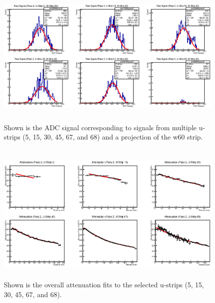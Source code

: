 \begin{figure}[h]
    \centering
    \includegraphics[height= 2.75in, keepaspectratio = true]{pass2}
    \caption{Shown is the ADC signal corresponding to signals from multiple u-strips 
    (5, 15, 30, 45, 67, and 68) and a projection of the w60 strip.}
    \label{fig:pass2}
\end{figure}

\begin{figure}[h]
    \centering
    \includegraphics[height= 2.75in, keepaspectratio = true]{atpass2}
    \caption{Shown is the overall attenuation fits to the selected u-strips 
    (5, 15, 30, 45, 67, and 68).}
    \label{fig:atpass2}
\end{figure}



\clearpage
\FloatBarrier
